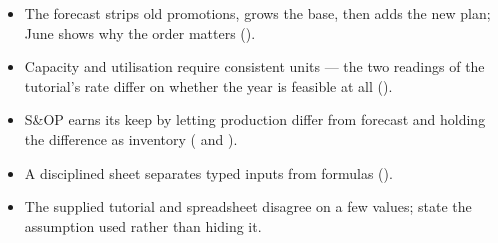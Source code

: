 \begin{chapterrecap}
\begin{itemize}
  \item The forecast strips old promotions, grows the base, then adds the new plan; June shows why the order matters ().
  \item Capacity and utilisation require consistent units --- the two readings of the tutorial's rate differ on whether the year is feasible at all ().
  \item S\&OP earns its keep by letting production differ from forecast and holding the difference as inventory ( and ).
  \item A disciplined sheet separates typed inputs from formulas ().
  \item The supplied tutorial and spreadsheet disagree on a few values; state the assumption used rather than hiding it.
\end{itemize}
\end{chapterrecap}
